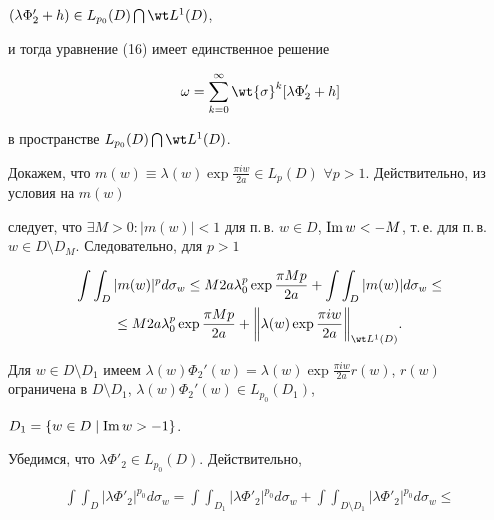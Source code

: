 \begin{pf}
$(\lambda \Phi'_2 + h) \in L_{p_0}(D) \bigcap \wt L^1 (D)$,


и тогда уравнение (16) имеет единственное решение


\begin{equation}


\omega = \sum_{k = 0}^{\infty} \wt{\sigma}^k [\lambda \Phi'_2 + h]


\end{equation}


в пространстве $L_{p_0}(D) \bigcap \wt L^1 (D)$.





Докажем, что $m(w) \equiv \lambda(w) \exp \frac{\pi i w}{2a} \in


L_{p} (D)$ $\forall p > 1$. Действительно, из условия на $m(w)$


следует, что $\exists M > 0: |m(w)| < 1$ для п.\,в. $w \in D$, $\im w <


-M$, т.\,е. для п.\,в. $w \in D \setminus D_M$. Следовательно, для $p > 1$


\begin{multline*}


\int\int_{D} |m(w)|^p d\sigma_w \leq M 2a \lambda_0^p \exp \frac{\pi M


p}{2a} + \int\int_{D} |m(w)| d\sigma_w \leq \\ \le


M 2a \lambda_0^p \exp \frac{\pi M p}{2a} + \bigg\|\lambda (w) \exp


\frac{\pi i w}{2a}\bigg\|_{\wt L^1(D)}.


\end{multline*}


Для $w \in D \setminus D_1$ имеем $\lambda(w) \Phi_2'(w) =


\lambda(w) \exp \frac{\pi i w}{2a} r(w)$, $r(w)$ ограничена в $D


\setminus D_1$, $\lambda (w) \Phi_2'(w) \in L_{p_0}(D_1)$,


$D_1 = \{w \in D \mid \operatorname{Im} w > - 1 \}$.


Убедимся, что $\lambda \Phi'_2 \in L_{p_0} (D)$. Действительно,


\begin{multline*}


\int\int_{D} |\lambda \Phi'_2|^{p_0} d\sigma_w =


\int\int_{D_1} |\lambda \Phi'_2|^{p_0} d\sigma_w +


\int\int_{D \setminus D_1} |\lambda \Phi'_2|^{p_0} d\sigma_w\leq \\



\end{multline*}
\end{pf}
